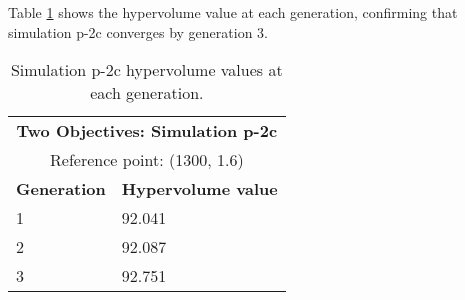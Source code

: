 Table \ref{tab:p2c-hypervolume} shows the hypervolume value at each generation, 
confirming that simulation p-2c converges by generation 3. 
\begin{table}[htbp!]
    \centering
    \onehalfspacing
    \caption{Simulation p-2c hypervolume values at each generation.}
	\label{tab:p2c-hypervolume}
    \footnotesize
    \begin{tabular}{ll}
    \hline 
    \multicolumn{2}{c}{\textbf{Two Objectives: Simulation p-2c}} \\
    \multicolumn{2}{c}{Reference point: (1300, 1.6)} \\
    \hline 
    \textbf{Generation} & \textbf{Hypervolume value} \\
    \hline
    1 & 92.041 \\
    2 & 92.087\\
    3 & 92.751 \\
    \hline
    \end{tabular}
\end{table}

